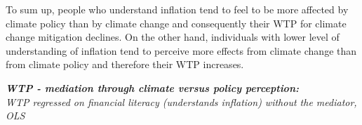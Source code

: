 \documentclass[a4paper,12pt]{article}
\begin{document}
To sum up, people who understand inflation tend to feel to be more affected by climate policy than by climate change and consequently their WTP for climate change mitigation declines. On the other hand, individuals with lower level of understanding of inflation tend to perceive more effects from climate change than from climate policy and therefore their WTP increases.

\vspace{1cm}
{\centering
\begin{threeparttable}
\singlespacing
\caption{\textit{\textbf{WTP - mediation through climate versus policy perception:}\\{WTP regressed on financial literacy (understands inflation) without the mediator, OLS}}}



\end{threeparttable}}
\end{document}
